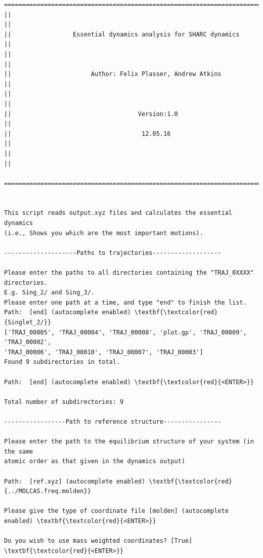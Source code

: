 \documentclass[a4paper,11pt,DIV=15,openany]{scrbook}
\begin{document}
\begin{oframed}
\footnotesize\begin{Verbatim}[commandchars=\\\{\}]
  ================================================================================
||                                                                                ||
||                 Essential dynamics analysis for SHARC dynamics                 ||
||                                                                                ||
||                      Author: Felix Plasser, Andrew Atkins                      ||
||                                                                                ||
||                                   Version:1.0                                  ||
||                                    12.05.16                                    ||
||                                                                                ||
  ================================================================================


This script reads output.xyz files and calculates the essential dynamics 
(i.e., Shows you which are the most important motions).
  
--------------------Paths to trajectories-------------------

Please enter the paths to all directories containing the "TRAJ_0XXXX" directories.
E.g. Sing_2/ and Sing_3/. 
Please enter one path at a time, and type "end" to finish the list.
Path:  [end] (autocomplete enabled) \textbf{\textcolor{red}{Singlet_2/}}
['TRAJ_00005', 'TRAJ_00004', 'TRAJ_00008', 'plot.gp', 'TRAJ_00009', 'TRAJ_00002', 
'TRAJ_00006', 'TRAJ_00010', 'TRAJ_00007', 'TRAJ_00003']
Found 9 subdirectories in total.

Path:  [end] (autocomplete enabled) \textbf{\textcolor{red}{<ENTER>}}

Total number of subdirectories: 9

-----------------Path to reference structure----------------

Please enter the path to the equilibrium structure of your system (in the same
atomic order as that given in the dynamics output)

Path:  [ref.xyz] (autocomplete enabled) \textbf{\textcolor{red}{../MOLCAS.freq.molden}}

Please give the type of coordinate file [molden] (autocomplete enabled) \textbf{\textcolor{red}{<ENTER>}}

Do you wish to use mass weighted coordinates? [True] \textbf{\textcolor{red}{<ENTER>}}


\end{Verbatim}
\end{oframed}
\end{document}
